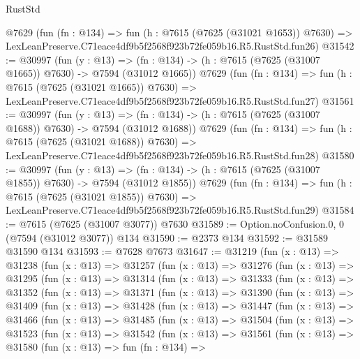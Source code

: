\begin{lexlean}{RustStd}
\begin{coremodule}
    @7629
    (fun (fn : @134) =>
    fun (h : @7615 (@7625 (@31021 @1653)) @7630) =>
    LexLeanPreserve.C71eace4df9b5f2568f923b72fe059b16.R5.RustStd.fun26)
@31542 := @30997
    (fun (y : @13) =>
    (fn : @134) -> (h : @7615 (@7625 (@31007 @1665)) @7630) -> @7594 (@31012 @1665))
    @7629
    (fun (fn : @134) =>
    fun (h : @7615 (@7625 (@31021 @1665)) @7630) =>
    LexLeanPreserve.C71eace4df9b5f2568f923b72fe059b16.R5.RustStd.fun27)
@31561 := @30997
    (fun (y : @13) =>
    (fn : @134) -> (h : @7615 (@7625 (@31007 @1688)) @7630) -> @7594 (@31012 @1688))
    @7629
    (fun (fn : @134) =>
    fun (h : @7615 (@7625 (@31021 @1688)) @7630) =>
    LexLeanPreserve.C71eace4df9b5f2568f923b72fe059b16.R5.RustStd.fun28)
@31580 := @30997
    (fun (y : @13) =>
    (fn : @134) -> (h : @7615 (@7625 (@31007 @1855)) @7630) -> @7594 (@31012 @1855))
    @7629
    (fun (fn : @134) =>
    fun (h : @7615 (@7625 (@31021 @1855)) @7630) =>
    LexLeanPreserve.C71eace4df9b5f2568f923b72fe059b16.R5.RustStd.fun29)
@31584 := @7615 (@7625 (@31007 @3077)) @7630
@31589 := Option.noConfusion.{0, 0} (@7594 (@31012 @3077)) @134
@31590 := @2373 @134
@31592 := @31589 @31590 @134
@31593 := @7628 @7673
@31647 := @31219
    (fun (x : @13) =>
    @31238
      (fun (x : @13) =>
      @31257
        (fun (x : @13) =>
        @31276
          (fun (x : @13) =>
          @31295
            (fun (x : @13) =>
            @31314
              (fun (x : @13) =>
              @31333
                (fun (x : @13) =>
                @31352
                  (fun (x : @13) =>
                  @31371
                    (fun (x : @13) =>
                    @31390
                      (fun (x : @13) =>
                      @31409
                        (fun (x : @13) =>
                        @31428
                          (fun (x : @13) =>
                          @31447
                            (fun (x : @13) =>
                            @31466
                              (fun (x : @13) =>
                              @31485
                                (fun (x : @13) =>
                                @31504
                                  (fun (x : @13) =>
                                  @31523
                                    (fun (x : @13) =>
                                    @31542
                                      (fun (x : @13) =>
                                      @31561
                                        (fun (x : @13) =>
                                        @31580
                                          (fun (x : @13) =>
                                          fun (fn : @134) =>

\end{coremodule}
\end{lexlean}
